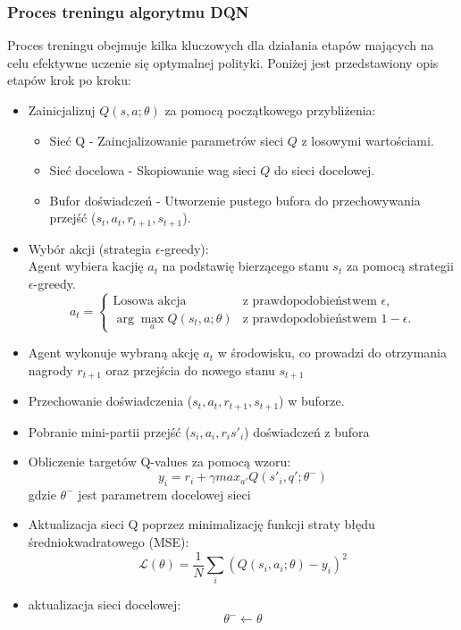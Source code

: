\documentclass[a4paper, 12pt]{article}
\begin{document}
    \subsubsection{Proces treningu algorytmu DQN}
    Proces treningu obejmuje kilka kluczowych dla działania etapów mających na celu efektywne uczenie się optymalnej polityki.
    Poniżej jest przedstawiony opis etapów krok po kroku:
    \begin{itemize}
        \item Zainicjalizuj \( Q(s,a;\theta) \) za pomocą początkowego przybliżenia:
        \begin{itemize}
            \item Sieć Q - Zaincjalizowanie parametrów sieci \( Q \) z losowymi wartościami.
            \item Sieć docelowa - Skopiowanie wag sieci \( Q \) do sieci docelowej.
            \item Bufor doświadczeń - Utworzenie pustego bufora do przechowywania przejść (\( s_t, a_t, r_{t+1}, s_{t+1} \)).
        \end{itemize}
        \item Wybór akcji (strategia \( \epsilon \)-greedy): \\
        Agent wybiera kacjię \( a_t \) na podstawię bierzącego stanu \( s_t \) za pomocą strategii \( \epsilon \)-greedy.
        \[
        a_t =
        \begin{cases} 
        \text{Losowa akcja} & \text{z prawdopodobieństwem } \epsilon, \\
        \arg\max_a Q(s_t, a; \theta) & \text{z prawdopodobieństwem } 1 - \epsilon.
        \end{cases}
        \]
        \item Agent wykonuje wybraną akcję \( a_t \) w środowisku, co prowadzi do otrzymania nagrody \( r_{t+1} \)
        oraz przejścia do nowego stanu \( s_{t+1} \)
        \item Przechowanie doświadczenia (\( s_t, a_t, r_{t+1}, s_{t+1} \)) w buforze.
        \item Pobranie mini-partii przejść (\(s_i, a_i, r_i s'_i \)) doświadczeń z bufora
        \item Obliczenie targetów Q-values za pomocą wzoru:
        \[ y_i = r_i + \gamma max_{a'}Q(s'_i,q';\theta^-) \]
        gdzie \( \theta^- \) jest parametrem docelowej sieci
        \item Aktualizacja sieci Q poprzez minimalizację funkcji straty błędu średniokwadratowego (MSE):
        \[ \mathcal{L}(\theta) = \frac{1}{N} \sum_{i}(Q(s_i,a_i;\theta)-y_i)^2 \]
        \item aktualizacja sieci docelowej:
        \[ \theta^- \leftarrow \theta \]
    \end{itemize}
\end{document}
